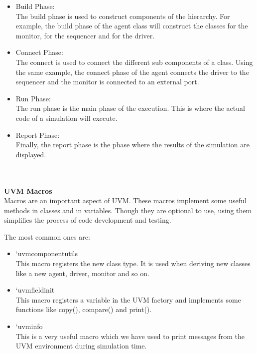 \documentclass[a4paper,11pt]{article}
\begin{document}
\begin{itemize}

\item Build Phase:
\ \\
The build phase is used to construct components of the hierarchy. For example, the build phase of the agent class will construct the classes for the monitor, for the sequencer and for the driver.

\item Connect Phase:
\ \\
The connect is used to connect the different sub components of a class. Using the same example, the connect phase of the agent connects the driver to the sequencer and the monitor is connected to an external port.

\item Run Phase:
\ \\
The run phase is the main phase of the execution. This is where the actual code of a simulation will execute.

\item Report Phase:
\ \\
Finally, the report phase is the phase where the results of the simulation are displayed.\cite{colorlesscube}

\end{itemize}
\ \\
\ \\
\textbf{UVM Macros}\cite{colorlesscube}
\ \\
Macros are an important aspect of UVM. These macros implement some useful methods in classes and in variables. Though they are optional to use, using them simplifies the process of code development and testing.\cite{colorlesscube}

The most common ones are:
\begin{itemize}

\item `uvm\textunderscore component\textunderscore utils
\ \\
This macro registers the new class type. It is used when deriving new classes like a new agent, driver, monitor and so on.

\item `uvm\textunderscore field\textunderscore init
\ \\
This macro registers a variable in the UVM factory and implements some functions like copy(), compare() and print().

\item `uvm\textunderscore info
\ \\
This is a very useful macro which we have used to print messages from the UVM environment during simulation time.\cite{colorlesscube}


\end{itemize}
\end{document}
